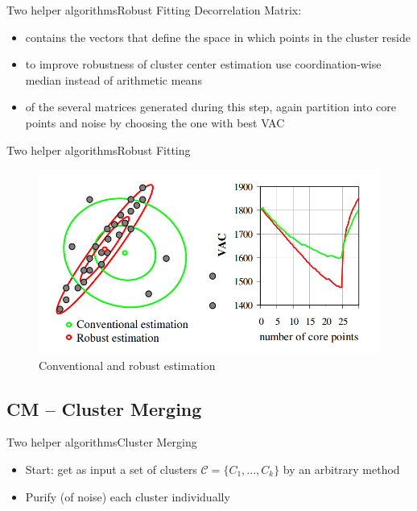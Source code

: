 \documentclass{beamer}
\begin{document}
  \begin{frame}{Two helper algorithms}{Robust Fitting}
    Decorrelation Matrix:
    \begin{itemize}
      \item contains the vectors that define the space in which points in the cluster reside
      \item to improve robustness of cluster center estimation use coordination-wise median instead of arithmetic means
      \item of the several matrices generated during this step, again partition into core points and noise by choosing the one with best VAC
    \end{itemize}    
  \end{frame}
  
  \note{}
  
  \begin{frame}{Two helper algorithms}{Robust Fitting}
    \begin{figure}
      \centering
      \includegraphics[width=\linewidth]{imgs/robust_estimation}
      \caption[]{Conventional and robust estimation\cite{Bohm2006-ts}}
      \label{fig:robust_estimation}
    \end{figure}    
  \end{frame}
  
  \note{}
  
  \subsection{CM -- Cluster Merging}
  
  \begin{frame}{Two helper algorithms}{Cluster Merging}
    \begin{itemize}
      \item Start: get as input a set of clusters $\mathcal{C} = \{C_1,...,C_k\}$ by an arbitrary method
      \item Purify (of noise) each cluster individually
    \end{itemize}    
  \end{frame}
  
\end{document}
